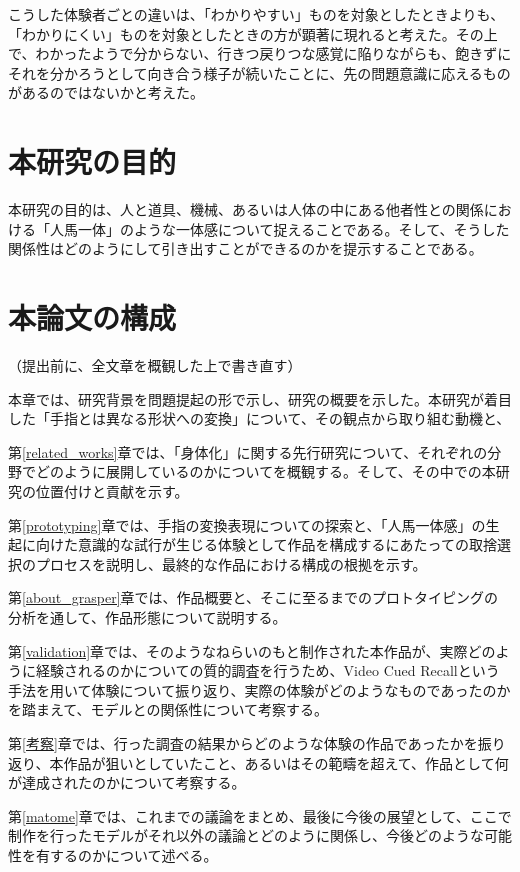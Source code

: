 こうした体験者ごとの違いは、「わかりやすい」ものを対象としたときよりも、「わかりにくい」ものを対象としたときの方が顕著に現れると考えた。その上で、わかったようで分からない、行きつ戻りつな感覚に陥りながらも、飽きずにそれを分かろうとして向き合う様子が続いたことに、先の問題意識に応えるものがあるのではないかと考えた。

\section{本研究の目的}

本研究の目的は、人と道具、機械、あるいは人体の中にある他者性との関係における「人馬一体」のような一体感について捉えることである。そして、そうした関係性はどのようにして引き出すことができるのかを提示することである。

\section{本論文の構成}
（提出前に、全文章を概観した上で書き直す）

本章では、研究背景を問題提起の形で示し、研究の概要を示した。本研究が着目した「手指とは異なる形状への変換」について、その観点から取り組む動機と、

第\ref{related_works}章では、「身体化」に関する先行研究について、それぞれの分野でどのように展開しているのかについてを概観する。そして、その中での本研究の位置付けと貢献を示す。

第\ref{prototyping}章では、手指の変換表現についての探索と、「人馬一体感」の生起に向けた意識的な試行が生じる体験として作品を構成するにあたっての取捨選択のプロセスを説明し、最終的な作品における構成の根拠を示す。

第\ref{about_grasper}章では、作品概要と、そこに至るまでのプロトタイピングの分析を通して、作品形態について説明する。

第\ref{validation}章では、そのようなねらいのもと制作された本作品が、実際どのように経験されるのかについての質的調査を行うため、Video Cued Recallという手法を用いて体験について振り返り、実際の体験がどのようなものであったのかを踏まえて、モデルとの関係性について考察する。

第\ref{考察}章では、行った調査の結果からどのような体験の作品であったかを振り返り、本作品が狙いとしていたこと、あるいはその範疇を超えて、作品として何が達成されたのかについて考察する。

第\ref{matome}章では、これまでの議論をまとめ、最後に今後の展望として、ここで制作を行ったモデルがそれ以外の議論とどのように関係し、今後どのような可能性を有するのかについて述べる。